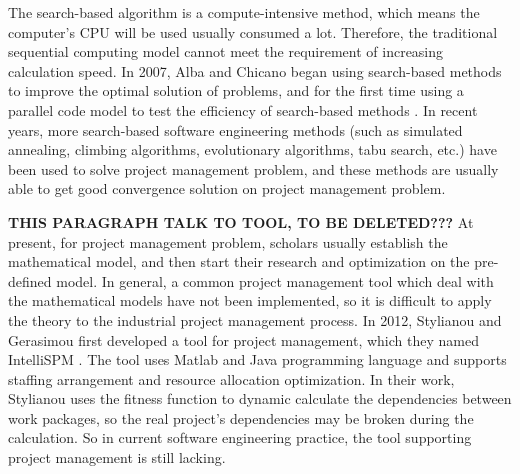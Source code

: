 The search-based algorithm is a compute-intensive method, which means the
computer's CPU will be used usually consumed a lot. Therefore, the traditional
sequential computing model cannot meet the requirement of increasing calculation
speed. In 2007, Alba and Chicano began using search-based methods to improve the
optimal solution of problems, and for the first time using a parallel code model
to test the efficiency of search-based methods \cite{pospichal}. In recent
years, more search-based software engineering methods (such as simulated
annealing, climbing algorithms, evolutionary algorithms, tabu search, etc.) have
been used to solve project management problem, and these methods are usually
able to get good convergence solution on project management problem.


\textbf{THIS PARAGRAPH TALK TO TOOL, TO BE DELETED???}
At present, for project management problem, scholars usually establish the
mathematical model, and then start their research and optimization on the
pre-defined model. In general, a common project management tool which deal with
the mathematical models have not been implemented, so it is difficult to apply
the theory to the industrial project management process. In 2012, Stylianou and
Gerasimou first developed a tool for project management, which they named
IntelliSPM \cite{stylianou}. The tool uses Matlab and Java programming language and 
supports staffing arrangement and resource allocation optimization. In
their work, Stylianou uses the fitness function to dynamic calculate the
dependencies between work packages, so the real project's dependencies may be
broken during the calculation. So in current software engineering practice, the
tool supporting project management is still lacking.

